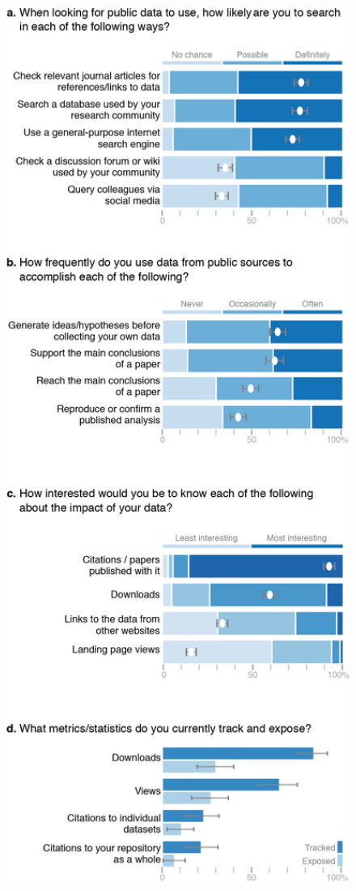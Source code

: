 \documentclass[english]{article}
\begin{document}
\begin{figure}[!ht]
\begin{center}
\includegraphics[width=4.8in]{MDC_Figure.png}

\end{center}
\end{figure}
\end{document}
